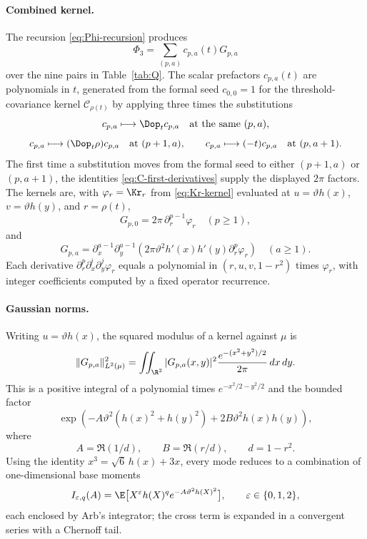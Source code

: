 \paragraph{Combined kernel.}
The recursion \eqref{eq:Phi-recursion} produces
\[
  \Phi_3=\sum_{(p,a)}c_{p,a}(t)G_{p,a}
\]
over the nine pairs in Table~\ref{tab:Q}.  The scalar prefactors $c_{p,a}(t)$ are polynomials in $t$, generated from the formal seed $c_{0,0}=1$ for the threshold-covariance kernel $\mathcal C_{\rho(t)}$ by applying three times the substitutions
\[
  c_{p,a}\longmapsto \Dop_tc_{p,a}\quad\text{at the same }(p,a),
\]
\[
  c_{p,a}\longmapsto (\Dop_t\rho)c_{p,a}\quad\text{at }(p+1,a),
  \qquad
  c_{p,a}\longmapsto (-t)c_{p,a}\quad\text{at }(p,a+1).
\]
The first time a substitution moves from the formal seed to either $(p+1,a)$ or $(p,a+1)$, the identities \eqref{eq:C-first-derivatives} supply the displayed $2\pi$ factors.  The kernels are, with $\varphi_r=\Kr_r$ from \eqref{eq:Kr-kernel} evaluated at $u=\vartheta h(x)$, $v=\vartheta h(y)$, and $r=\rho(t)$,
\[
  G_{p,0}=2\pi\,\partial_r^{p-1}\varphi_r\quad(p\ge1),
\]
and
\[
  G_{p,a}=\partial_x^{a-1}\partial_y^{a-1}
  \left(2\pi\vartheta^2h'(x)h'(y)\partial_r^p\varphi_r\right)
  \quad(a\ge1).
\]
Each derivative $\partial_r^p\partial_x^i\partial_y^j\varphi_r$ equals a polynomial in $(r,u,v,1-r^2)$ times $\varphi_r$, with integer coefficients computed by a fixed operator recurrence.

\paragraph{Gaussian norms.}
Writing $u=\vartheta h(x)$, the squared modulus of a kernel against $\mu$ is
\[
  \|G_{p,a}\|_{L^2(\mu)}^2=
  \iint_{\R^2}|G_{p,a}(x,y)|^2{e^{-(x^2+y^2)/2}\over2\pi}\,dx\,dy.
\]
This is a positive integral of a polynomial times $e^{-x^2/2-y^2/2}$ and the bounded factor
\[
  \exp\left(-A\vartheta^2(h(x)^2+h(y)^2)+2B\vartheta^2h(x)h(y)\right),
\]
where
\[
  A=\Re(1/d),\qquad B=\Re(r/d),\qquad d=1-r^2.
\]
Using the identity $x^3=\sqrt6\,h(x)+3x$, every mode reduces to a combination of one-dimensional base moments
\[
  I_{\varepsilon,q}(A)=\E\bigl[X^\varepsilon h(X)^q e^{-A\vartheta^2h(X)^2}\bigr],
  \qquad \varepsilon\in\{0,1,2\},
\]
each enclosed by Arb's integrator; the cross term is expanded in a convergent series with a Chernoff tail.

